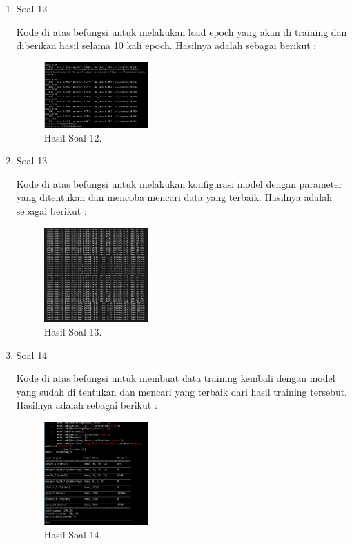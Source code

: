 \begin{enumerate}
	\item Soal 12
	\hfill\break
	
	Kode di atas befungsi untuk melakukan load epoch yang akan di training dan diberikan hasil selama 10 kali epoch. Hasilnya adalah sebagai berikut :  
	\begin{figure}[H]
	\centering
		\includegraphics[width=4cm]{figures/1174005/tugas7/materi/hasil12.PNG}
		\caption{Hasil Soal 12.}
	\end{figure}

	\item Soal 13
	\hfill\break
	
	Kode di atas befungsi untuk melakukan konfigurasi model dengan parameter yang ditentukan dan mencoba mencari data yang terbaik. Hasilnya adalah sebagai berikut :  
	\begin{figure}[H]
	\centering
		\includegraphics[width=4cm]{figures/1174005/tugas7/materi/hasil13.PNG}
		\caption{Hasil Soal 13.}
	\end{figure}

	\item Soal 14
	\hfill\break
	
	Kode di atas befungsi untuk membuat data training kembali dengan model yang sudah di tentukan dan mencari yang terbaik dari hasil training tersebut. Hasilnya adalah sebagai berikut :  
	\begin{figure}[H]
	\centering
		\includegraphics[width=4cm]{figures/1174005/tugas7/materi/hasil14.PNG}
		\caption{Hasil Soal 14.}
	\end{figure}


\end{enumerate}
